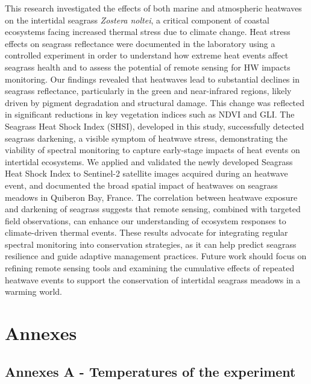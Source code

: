 \documentclass[
  letterpaper,
  11pt,
  english,
  singlespacing,
  headsepline]{MastersDoctoralThesis}
\begin{document}
\begin{spacing}{1.5}
This research investigated the effects of both marine and atmospheric
heatwaves on the intertidal seagrass \emph{Zostera noltei}, a critical
component of coastal ecosystems facing increased thermal stress due to
climate change. Heat stress effects on seagrass reflectance were
documented in the laboratory using a controlled experiment in order to
understand how extreme heat events affect seagrass health and to assess
the potential of remote sensing for HW impacts monitoring. Our findings
revealed that heatwaves lead to substantial declines in seagrass
reflectance, particularly in the green and near-infrared regions, likely
driven by pigment degradation and structural damage. This change was
reflected in significant reductions in key vegetation indices such as
NDVI and GLI. The Seagrass Heat Shock Index (SHSI), developed in this
study, successfully detected seagrass darkening, a visible symptom of
heatwave stress, demonstrating the viability of spectral monitoring to
capture early-stage impacts of heat events on intertidal ecosystems. We
applied and validated the newly developed Seagrass Heat Shock Index to
Sentinel-2 satellite images acquired during an heatwave event, and
documented the broad spatial impact of heatwaves on seagrass meadows in
Quiberon Bay, France. The correlation between heatwave exposure and
darkening of seagrass suggests that remote sensing, combined with
targeted field observations, can enhance our understanding of ecosystem
responses to climate-driven thermal events. These results advocate for
integrating regular spectral monitoring into conservation strategies, as
it can help predict seagrass resilience and guide adaptive management
practices. Future work should focus on refining remote sensing tools and
examining the cumulative effects of repeated heatwave events to support
the conservation of intertidal seagrass meadows in a warming world.

\newpage

\section{Annexes}\label{annexes-1}

\subsection{Annexes A - Temperatures of the
experiment}\label{sec-AnnexeA_h}

\begin{figure}

\centering{

}
\end{figure}
\end{spacing}
\end{document}

